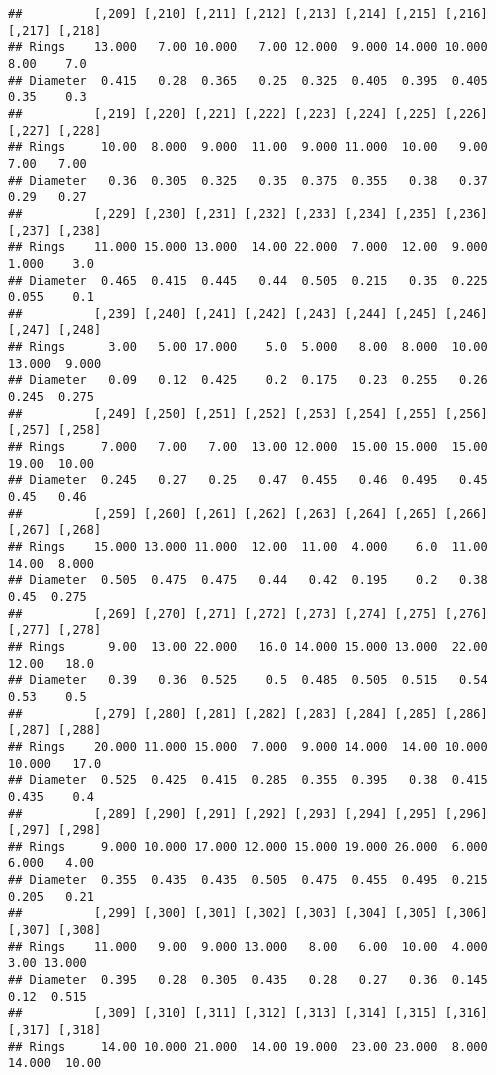 \documentclass[
]{article}
\begin{document}
\begin{verbatim}
##          [,209] [,210] [,211] [,212] [,213] [,214] [,215] [,216] [,217] [,218]
## Rings    13.000   7.00 10.000   7.00 12.000  9.000 14.000 10.000   8.00    7.0
## Diameter  0.415   0.28  0.365   0.25  0.325  0.405  0.395  0.405   0.35    0.3
##          [,219] [,220] [,221] [,222] [,223] [,224] [,225] [,226] [,227] [,228]
## Rings     10.00  8.000  9.000  11.00  9.000 11.000  10.00   9.00   7.00   7.00
## Diameter   0.36  0.305  0.325   0.35  0.375  0.355   0.38   0.37   0.29   0.27
##          [,229] [,230] [,231] [,232] [,233] [,234] [,235] [,236] [,237] [,238]
## Rings    11.000 15.000 13.000  14.00 22.000  7.000  12.00  9.000  1.000    3.0
## Diameter  0.465  0.415  0.445   0.44  0.505  0.215   0.35  0.225  0.055    0.1
##          [,239] [,240] [,241] [,242] [,243] [,244] [,245] [,246] [,247] [,248]
## Rings      3.00   5.00 17.000    5.0  5.000   8.00  8.000  10.00 13.000  9.000
## Diameter   0.09   0.12  0.425    0.2  0.175   0.23  0.255   0.26  0.245  0.275
##          [,249] [,250] [,251] [,252] [,253] [,254] [,255] [,256] [,257] [,258]
## Rings     7.000   7.00   7.00  13.00 12.000  15.00 15.000  15.00  19.00  10.00
## Diameter  0.245   0.27   0.25   0.47  0.455   0.46  0.495   0.45   0.45   0.46
##          [,259] [,260] [,261] [,262] [,263] [,264] [,265] [,266] [,267] [,268]
## Rings    15.000 13.000 11.000  12.00  11.00  4.000    6.0  11.00  14.00  8.000
## Diameter  0.505  0.475  0.475   0.44   0.42  0.195    0.2   0.38   0.45  0.275
##          [,269] [,270] [,271] [,272] [,273] [,274] [,275] [,276] [,277] [,278]
## Rings      9.00  13.00 22.000   16.0 14.000 15.000 13.000  22.00  12.00   18.0
## Diameter   0.39   0.36  0.525    0.5  0.485  0.505  0.515   0.54   0.53    0.5
##          [,279] [,280] [,281] [,282] [,283] [,284] [,285] [,286] [,287] [,288]
## Rings    20.000 11.000 15.000  7.000  9.000 14.000  14.00 10.000 10.000   17.0
## Diameter  0.525  0.425  0.415  0.285  0.355  0.395   0.38  0.415  0.435    0.4
##          [,289] [,290] [,291] [,292] [,293] [,294] [,295] [,296] [,297] [,298]
## Rings     9.000 10.000 17.000 12.000 15.000 19.000 26.000  6.000  6.000   4.00
## Diameter  0.355  0.435  0.435  0.505  0.475  0.455  0.495  0.215  0.205   0.21
##          [,299] [,300] [,301] [,302] [,303] [,304] [,305] [,306] [,307] [,308]
## Rings    11.000   9.00  9.000 13.000   8.00   6.00  10.00  4.000   3.00 13.000
## Diameter  0.395   0.28  0.305  0.435   0.28   0.27   0.36  0.145   0.12  0.515
##          [,309] [,310] [,311] [,312] [,313] [,314] [,315] [,316] [,317] [,318]
## Rings     14.00 10.000 21.000  14.00 19.000  23.00 23.000  8.000 14.000  10.00

\end{verbatim}
\end{document}
